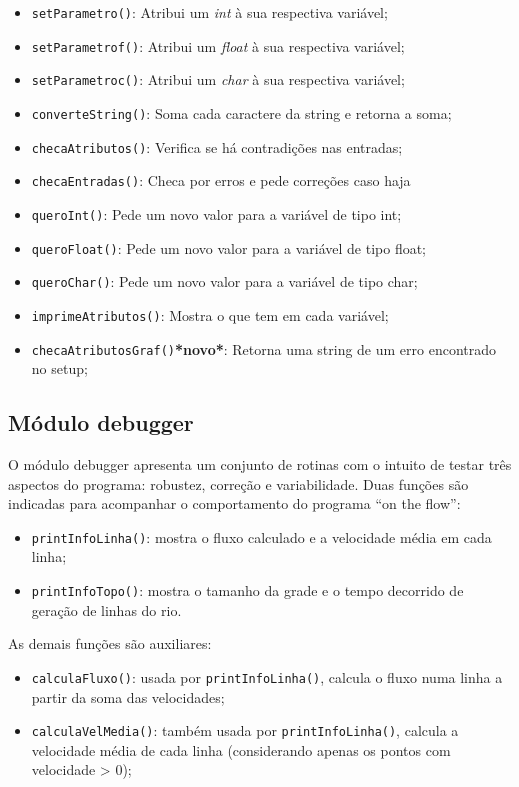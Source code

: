 \documentclass[11pt,a4paper]{article}
\begin{document}
\begin{itemize}
\item \verb|setParametro()|: Atribui um \textit{int} à sua respectiva variável;
\item \verb|setParametrof()|: Atribui um \textit{float} à sua respectiva variável;
\item \verb|setParametroc()|: Atribui um \textit{char} à sua respectiva variável;
\item \verb|converteString()|: Soma cada caractere da string e retorna a soma;
\item \verb|checaAtributos()|: Verifica se há contradições nas entradas;
\item \verb|checaEntradas()|: Checa por erros e pede correções caso haja
\item \verb|queroInt()|: Pede um novo valor para a variável de tipo int;
\item \verb|queroFloat()|: Pede um novo valor para a variável de tipo float;
\item \verb|queroChar()|: Pede um novo valor para a variável de tipo char;
\item \verb|imprimeAtributos()|: Mostra o que tem em cada variável;
\item \verb|checaAtributosGraf()|\textbf{*novo*}: Retorna uma string de um erro encontrado no setup;
\end{itemize}

\subsection{Módulo debugger}
O módulo debugger apresenta um conjunto de rotinas com o intuito de testar três aspectos do programa: robustez, correção e variabilidade. Duas funções são indicadas para acompanhar o comportamento do programa “on the flow”:

\begin{itemize}
\item \verb|printInfoLinha()|: mostra o fluxo calculado e a velocidade média em cada linha;
\item \verb|printInfoTopo()|: mostra o tamanho da grade e o tempo decorrido de geração de linhas do rio.
\end{itemize}

As demais funções são auxiliares:

\begin{itemize}
\item \verb|calculaFluxo()|: usada por \verb|printInfoLinha()|, calcula o fluxo numa linha a partir da soma das velocidades;
\item \verb|calculaVelMedia()|: também usada por \verb|printInfoLinha()|, calcula a velocidade média de cada linha (considerando apenas os pontos com velocidade > 0);
\end{itemize}
\end{document}
